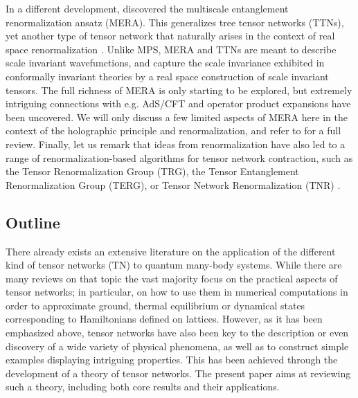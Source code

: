 \documentclass[rmp,aps,reprint,superscriptaddress,nobalancelastpage]{revtex4-1}
\begin{document}
In a different development, \citet{vidal2007entanglement,vidal:mera} discovered the multiscale entanglement renormalization ansatz (MERA). This generalizes tree tensor networks (TTNs), yet another type of tensor network that naturally arises in the context of real space renormalization \cite{fannes1992ground,shi2006classical,murg2010simtinulag,silvi2010homogeneous}. Unlike MPS, MERA and TTNs are meant to describe scale invariant wavefunctions, and capture the scale invariance exhibited in conformally invariant theories by a real space construction of scale invariant tensors. The full richness of MERA is only starting to be explored, but extremely intriguing connections with e.g. AdS/CFT and operator product expansions \cite{pfeifer:conformal-MERA, evenbly2016local} have been uncovered. We will only discuss a few limited aspects of MERA here in the context of the holographic principle and renormalization, and refer to \citet{evenbly2014algorithms} for a full review.
Finally, let us remark that ideas from renormalization have also led to a
range of renormalization-based algorithms for tensor network contraction,
such as the Tensor Renormalization Group (TRG), the Tensor Entanglement
Renormalization Group (TERG), or Tensor Network Renormalization (TNR)
\cite{xie2012coarse,xie2009second,zhao2010renormalization,jiang2008accurate,gu:TERG,PhysRevB.95.045117,Levin_2007,evenbly:tensor-renormalization}.

\subsection{Outline}

There already exists an extensive literature on the application of the different kind of tensor networks (TN) to quantum many-body systems. While there are many reviews on that topic \cite{hallberg2006new,schollwoeck:rmp,schollwoeck:review-annphys,bridgeman:handwaving,orus:tn-review,murg:peps-review,cirac2009renormalization,biamonte2019lectures} the vast majority focus on the practical aspects of tensor networks; in particular, on how to use them in numerical computations in order to approximate ground, thermal equilibrium or dynamical states corresponding to Hamiltonians defined on lattices. However, as it has been emphasized above, tensor networks have also been key to the description or even discovery of a wide variety of physical phenomena, as well as to construct simple examples displaying intriguing properties. This has been achieved through the development of a theory of tensor networks.  The present paper aims at reviewing such a theory, including both core  results and their applications.
\end{document}

